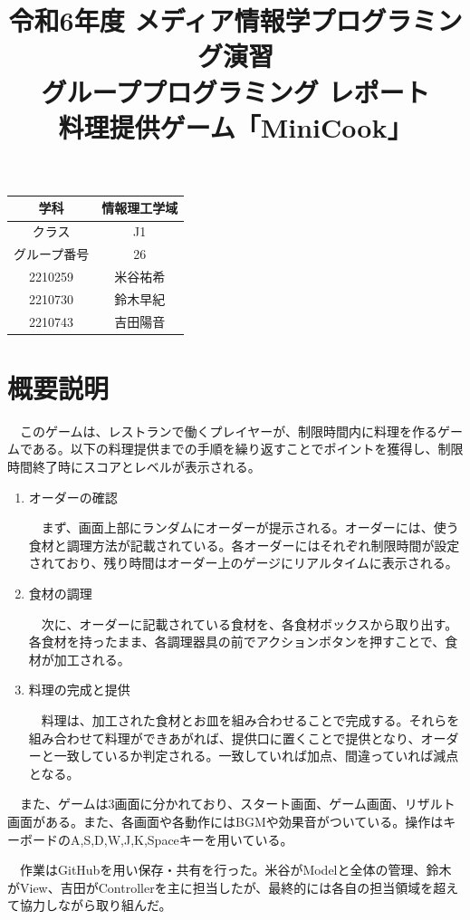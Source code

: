 \documentclass[a4j]{jarticle} %
\title{令和6年度 メディア情報学プログラミング演習\\グループプログラミング レポート\\料理提供ゲーム「MiniCook」}
\begin{document}
\maketitle

\begin{center}%
  \begin{tabular}{|c||c|}
      \hline
      学科&情報理工学域\\
      \hline
      クラス&J1\\
      \hline
      グループ番号&26\\
      \hline
      2210259&米谷祐希\\
      \hline
      2210730&鈴木早紀\\
      \hline
      2210743&吉田陽音\\
      \hline
  \end{tabular}
\end{center}

\newpage

\section{概要説明}
　このゲームは、レストランで働くプレイヤーが、制限時間内に料理を作るゲームである。以下の料理提供までの手順を繰り返すことでポイントを獲得し、制限時間終了時にスコアとレベルが表示される。
\begin{enumerate}
  \item オーダーの確認\par
  　まず、画面上部にランダムにオーダーが提示される。オーダーには、使う食材と調理方法が記載されている。各オーダーにはそれぞれ制限時間が設定されており、残り時間はオーダー上のゲージにリアルタイムに表示される。
  \item 食材の調理\par
  　次に、オーダーに記載されている食材を、各食材ボックスから取り出す。各食材を持ったまま、各調理器具の前でアクションボタンを押すことで、食材が加工される。
  \item 料理の完成と提供\par
  　料理は、加工された食材とお皿を組み合わせることで完成する。それらを組み合わせて料理ができあがれば、提供口に置くことで提供となり、オーダーと一致しているか判定される。一致していれば加点、間違っていれば減点となる。   
\end{enumerate}
　また、ゲームは3画面に分かれており、スタート画面、ゲーム画面、リザルト画面がある。また、各画面や各動作にはBGMや効果音がついている。操作はキーボードのA,S,D,W,J,K,Spaceキーを用いている。\par
　作業はGitHubを用い保存・共有を行った。米谷がModelと全体の管理、鈴木がView、吉田がControllerを主に担当したが、最終的には各自の担当領域を超えて協力しながら取り組んだ。
\end{document}
